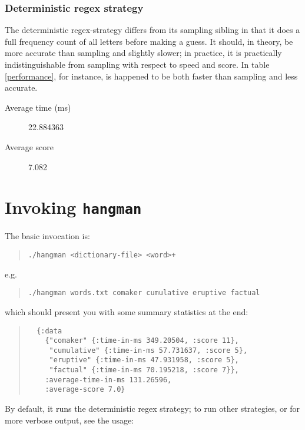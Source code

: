 \documentclass{article}
\begin{document}
\subsubsection{Deterministic regex strategy}

The deterministic regex-strategy differs from its sampling sibling in
that it does a full frequency count of all letters before making a
guess. It should, in theory, be more accurate than sampling and
slightly slower; in practice, it is practically indistinguishable from
sampling with respect to speed and score. In table \ref{performance},
for instance, is happened to be both faster than sampling and less
accurate.

\begin{description}
  \item [Average time (ms)] 22.884363
  \item [Average score] 7.082
\end{description}

\section{Invoking \texttt{hangman}}

The basic invocation is:

\begin{quote}
  \texttt{./hangman <dictionary-file> <word>+}
\end{quote}

e.g.

\begin{quote}
  \texttt{./hangman words.txt comaker cumulative eruptive factual}
\end{quote}

which should present you with some summary statistics at the end:

\begin{quote}
\begin{verbatim}
  {:data
    {"comaker" {:time-in-ms 349.20504, :score 11},
     "cumulative" {:time-in-ms 57.731637, :score 5},
     "eruptive" {:time-in-ms 47.931958, :score 5},
     "factual" {:time-in-ms 70.195218, :score 7}},
    :average-time-in-ms 131.26596,
    :average-score 7.0}
\end{verbatim}
\end{quote}

By default, it runs the deterministic regex strategy; to run other
strategies, or for more verbose output, see the usage:
\end{document}
